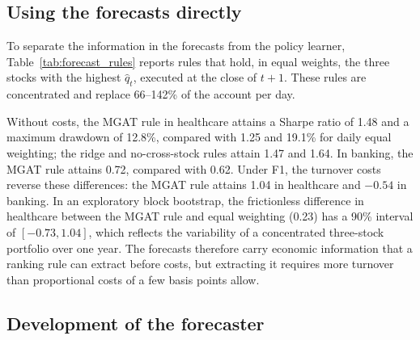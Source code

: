 

\subsection{Using the forecasts directly}\label{subsec:rules}

{\color{blue}To separate the information in the forecasts from the policy learner, Table~\ref{tab:forecast_rules} reports rules that hold, in equal weights, the three stocks with the highest $\hat q_t$, executed at the close of $t+1$. These rules are concentrated and replace 66--142\% of the account per day.

Without costs, the MGAT rule in healthcare attains a Sharpe ratio of 1.48 and a maximum drawdown of 12.8\%, compared with 1.25 and 19.1\% for daily equal weighting; the ridge and no-cross-stock rules attain 1.47 and 1.64. In banking, the MGAT rule attains 0.72, compared with 0.62. Under F1, the turnover costs reverse these differences: the MGAT rule attains 1.04 in healthcare and $-0.54$ in banking. In an exploratory block bootstrap, the frictionless difference in healthcare between the MGAT rule and equal weighting (0.23) has a 90\% interval of $[-0.73, 1.04]$, which reflects the variability of a concentrated three-stock portfolio over one year. The forecasts therefore carry economic information that a ranking rule can extract before costs, but extracting it requires more turnover than proportional costs of a few basis points allow.\par}




\subsection{Development of the forecaster}\label{subsec:history}

